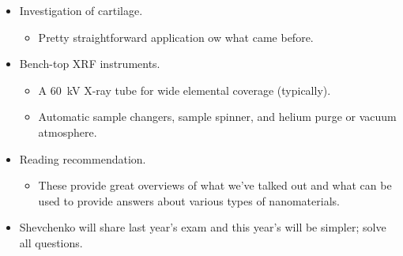 \documentclass[../notes.tex]{subfiles}
\begin{document}
\begin{itemize}
\begin{itemize}
        \item The beam size in Sector 2 is \SI{450}{\nano\meter} and the step is \SI{200}{\nano\meter}.
    \end{itemize}
    \item Investigation of cartilage.
    \begin{itemize}
        \item Pretty straightforward application ow what came before.
    \end{itemize}
    \item Bench-top XRF instruments.
    \begin{itemize}
        \item A \SI{60}{\kilo\volt} X-ray tube for wide elemental coverage (typically).
        \item Automatic sample changers, sample spinner, and helium purge or vacuum atmosphere.
    \end{itemize}
    \item Reading recommendation.
    \begin{itemize}
        \item These provide great overviews of what we've talked out and what can be used to provide answers about various types of nanomaterials.
    \end{itemize}
    \item Shevchenko will share last year's exam and this year's will be simpler; solve all questions.
\end{itemize}
\end{document}
